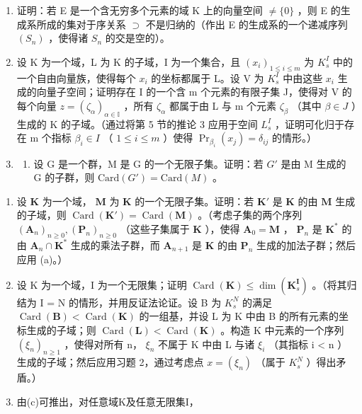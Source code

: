 \BourbakiExercisesSection

\begin{enumerate}
\def\labelenumi{\arabic{enumi}.}
\item
  证明：若 E 是一个含无穷多个元素的域 K 上的向量空间 \(\neq\{0\}\) ，则 E 的生成系所成的集对于序关系 \(\supset\) 不是归纳的（作出 E 的生成系的一个递减序列 \((S_{n})\) ，使得诸 \(S_{n}\) 的交是空的）。
\item
  设 K 为一个域，L 为 K 的子域，I 为一个集合，且 \((x_{i})_{1\leqslant i\leqslant m}\) 为 \(K_{s}^{I}\) 中的一个自由向量族，使得每个 \(x_{i}\) 的坐标都属于 L。设 V 为 \(K_{s}^{I}\) 中由这些 \(x_{i}\) 生成的向量子空间；证明存在 I 的一个含 m 个元素的有限子集 J，使得对 V 的每个向量 \(z=(\zeta_{\alpha})_{\alpha\in\mathbb{I}}\) ，所有 \(\zeta_{\alpha}\) 都属于由 L 与 m 个元素 \(\zeta_{\beta}\) （其中 \(\beta\in J\) ）生成的 K 的子域。（通过将第 5 节的推论 3 应用于空间 \(L_{s}^{I}\) ，证明可化归于存在 m 个指标 \(\beta_{i}\in I\) （ \(1\leqslant i\leqslant m\) ）使得 \(\Pr_{\beta_{i}}(x_{j})=\delta_{ij}\) 的情形。）
\item
  \begin{enumerate}
  \def\labelenumii{(\alph{enumii})}
  \tightlist
  \item
    设 G 是一个群，M 是 G 的一个无限子集。证明：若 \(G'\) 是由 M 生成的 G 的子群，则 \(\text{Card}(G') = \text{Card}(M)\) 。
  \end{enumerate}
\end{enumerate}

\begin{enumerate}
\def\labelenumi{(\alph{enumi})}
\setcounter{enumi}{1}
\item
  设 \(\mathbf{K}\) 为一个域， \(\mathbf{M}\) 为 \(\mathbf{K}\) 的一个无限子集。证明：若 \(\mathbf{K}'\) 是 \(\mathbf{K}\) 的由 \(\mathbf{M}\) 生成的子域，则 \(\operatorname{Card}(\mathbf{K}') = \operatorname{Card}(\mathbf{M})\) 。（考虑子集的两个序列 \((\mathbf{A}_n)_{n \geqslant 0}, (\mathbf{P}_n)_{n \geqslant 0}\) （这些子集属于 \(\mathbf{K}\) ），使得 \(\mathbf{A}_0 = \mathbf{M}\) ， \(\mathbf{P}_n\) 是 \(\mathbf{K}^*\) 的由 \(\mathbf{A}_n \cap \mathbf{K}^*\) 生成的乘法子群，而 \(\mathbf{A}_{n+1}\) 是 \(\mathbf{K}\) 的由 \(\mathbf{P}_n\) 生成的加法子群；然后应用 (a)。）
\item
  设 K 为一个域，I 为一个无限集；证明 \(\operatorname{Card}(\mathbf{K}) \leqslant \dim(\mathbf{K}_{s}^{\mathbf{I}})\) 。（将其归结为 I = N 的情形，并用反证法论证。设 B 为 \(K_{s}^{N}\) 的满足 \(\operatorname{Card}(\mathbf{B}) < \operatorname{Card}(\mathbf{K})\) 的一组基，并设 L 为 K 中由 B 的所有元素的坐标生成的子域；则 \(\operatorname{Card}(\mathbf{L}) < \operatorname{Card}(\mathbf{K})\) 。构造 K 中元素的一个序列 \((\xi_{n})_{n \geqslant 1}\) ，使得对所有 n， \(\xi_{n}\) 不属于 K 中由 L 与诸 \(\xi_{i}\) （其指标 i \textless{} n ）生成的子域；然后应用习题 2，通过考虑点 \(x = (\xi_{n})\) （属于 \(K_{s}^{N}\) ）得出矛盾。）
\item
  由(c)可推出，对任意域K及任意无限集I，
\end{enumerate}

